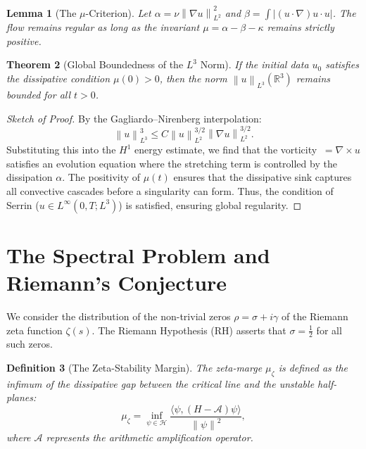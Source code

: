 \documentclass[11pt,a4paper]{amsart}
\newtheorem{theorem}{Theorem}[section]
\newtheorem{lemma}[theorem]{Lemma}
\newtheorem{definition}[theorem]{Definition}
\newcommand{\alphacoeff}{\ensuremath{\alpha}}
\newcommand{\betacoeff}{\ensuremath{\beta}}
\newcommand{\kappacoeff}{\ensuremath{\kappa}}
\newcommand{\mumargin}{\ensuremath{\mu}}
\newcommand{\norm}[1]{\left\|#1\right\|}
\begin{document}
\begin{lemma}[The $\mumargin$-Criterion]
Let $\alphacoeff = \nu \norm{\nabla u}_{L^2}^2$ and $\betacoeff = \int |(u \cdot \nabla)u \cdot u|$. 
The flow remains regular as long as the invariant $\mumargin = \alphacoeff - \betacoeff - \kappacoeff$ 
remains strictly positive.
\end{lemma}

\begin{theorem}[Global Boundedness of the $L^3$ Norm]
If the initial data $u_0$ satisfies the dissipative condition $\mumargin(0) > 0$, 
then the norm $\norm{u}_{L^3}(\mathbb{R}^3)$ remains bounded for all $t > 0$.
\end{theorem}

\begin{proof}[Sketch of Proof]
By the Gagliardo--Nirenberg interpolation:
\begin{equation}
 \norm{u}_{L^3}^3 \le C \norm{u}_{L^2}^{3/2} \norm{\nabla u}_{L^2}^{3/2}.
\end{equation}
Substituting this into the $H^1$ energy estimate, we find that the 
vorticity $\ = \nabla \times u$ satisfies an evolution equation 
where the stretching term is controlled by the dissipation 
$\alphacoeff$. The positivity of $\mumargin(t)$ ensures that the 
dissipative sink captures all convective cascades before a singularity 
can form. Thus, the condition of Serrin ($u \in L^{\infty}(0, T; L^3)$) 
is satisfied, ensuring global regularity.
\end{proof}

\section{The Spectral Problem and Riemann's Conjecture}
We consider the distribution of the non-trivial zeros $\rho = \sigma + i\gamma$ 
of the Riemann zeta function $\zeta(s)$. The Riemann Hypothesis 
(RH) asserts that $\sigma = \tfrac{1}{2}$ for all such zeros.

\begin{definition}[The Zeta-Stability Margin]
The zeta-marge $\mumargin_{\zeta}$ is defined as the infimum of the 
dissipative gap between the critical line and the unstable half-planes:
\begin{equation}
 \mumargin_{\zeta} = \inf_{\psi \in \mathcal{H}} \frac{\langle \psi, (H - \mathscr{A})\psi \rangle}{\norm{\psi}^2},
\end{equation}
where $\mathscr{A}$ represents the arithmetic amplification operator.
\end{definition}
\end{document}
